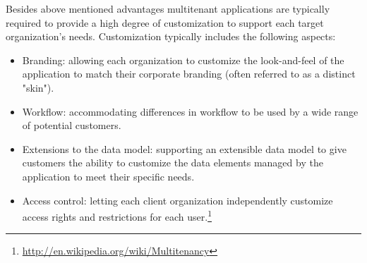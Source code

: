 \begin{center}
   
\end{center}

Besides above mentioned advantages multitenant applications are typically required to provide a high degree of customization to support each target organization's needs. Customization typically includes the following aspects:
\begin{itemize}
  \item Branding: allowing each organization to customize the look-and-feel of the application to match their corporate branding (often referred to as a distinct "skin").
	\item Workflow: accommodating differences in workflow to be used by a wide range of potential customers.
	\item Extensions to the data model: supporting an extensible data model to give customers the ability to customize the data elements managed by the application to meet their specific needs.
	\item Access control: letting each client organization independently customize access rights and restrictions for each user.\footnote{\url{http://en.wikipedia.org/wiki/Multitenancy}}
\end{itemize}
